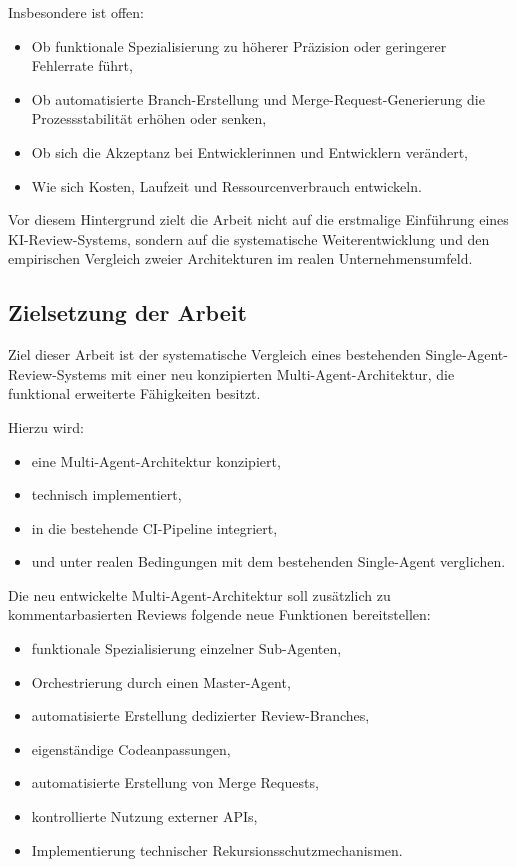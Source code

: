 Insbesondere ist offen:

\begin{itemize}
	\item Ob funktionale Spezialisierung zu höherer Präzision oder geringerer Fehlerrate führt,
	\item Ob automatisierte Branch-Erstellung und Merge-Request-Generierung die Prozessstabilität erhöhen oder senken,
	\item Ob sich die Akzeptanz bei Entwicklerinnen und Entwicklern verändert,
	\item Wie sich Kosten, Laufzeit und Ressourcenverbrauch entwickeln.
\end{itemize}

Vor diesem Hintergrund zielt die Arbeit nicht auf die erstmalige Einführung eines KI-Review-Systems, sondern auf die systematische Weiterentwicklung und den empirischen Vergleich zweier Architekturen im realen Unternehmensumfeld.



\subsection{Zielsetzung der Arbeit}

Ziel dieser Arbeit ist der systematische Vergleich eines bestehenden Single-Agent-Review-Systems mit einer neu konzipierten Multi-Agent-Architektur, die funktional erweiterte Fähigkeiten besitzt.

Hierzu wird:

\begin{itemize}
	\item eine Multi-Agent-Architektur konzipiert,
	\item technisch implementiert,
	\item in die bestehende CI-Pipeline integriert,
	\item und unter realen Bedingungen mit dem bestehenden Single-Agent verglichen.
\end{itemize}

Die neu entwickelte Multi-Agent-Architektur soll zusätzlich zu kommentarbasierten Reviews folgende neue Funktionen bereitstellen:

\begin{itemize}
	\item funktionale Spezialisierung einzelner Sub-Agenten,
	\item Orchestrierung durch einen Master-Agent,
	\item automatisierte Erstellung dedizierter Review-Branches,
	\item eigenständige Codeanpassungen,
	\item automatisierte Erstellung von Merge Requests,
	\item kontrollierte Nutzung externer APIs,
	\item Implementierung technischer Rekursionsschutzmechanismen.
\end{itemize}

